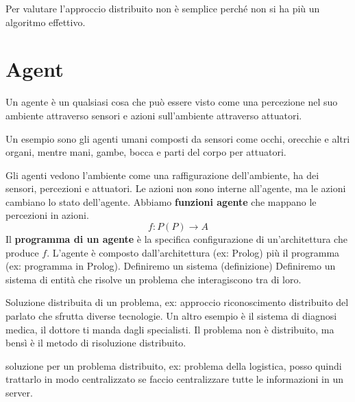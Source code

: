 Per valutare l'approccio distribuito non è semplice perché non si ha più un
algoritmo effettivo.

\section{Agent}
\begin{definizione}
    Un agente è un qualsiasi cosa che può essere visto come una percezione nel
    suo ambiente attraverso sensori e azioni sull'ambiente attraverso attuatori.
\end{definizione}

\begin{esempio}
    Un esempio sono gli agenti umani composti da sensori come occhi, orecchie e altri
    organi, mentre mani, gambe, bocca e parti del corpo per attuatori.
\end{esempio}

Gli agenti vedono l'ambiente come una raffigurazione dell'ambiente, ha dei sensori,
percezioni e attuatori. Le azioni non sono interne all'agente, ma le azioni cambiano
lo stato dell'agente. Abbiamo \textbf{funzioni agente} che mappano le percezioni
in azioni.
$$f:P(P)\rightarrow A$$
Il \textbf{programma di un agente} è la specifica configurazione di un'architettura che
produce $f$.
L'agente è composto dall'architettura (ex: Prolog) più il programma (ex: programma in Prolog).
Definiremo un sistema (definizione)
Definiremo un sistema di entità che risolve un problema che interagiscono tra di loro.

Soluzione distribuita di un problema, ex: approccio riconoscimento distribuito
del parlato che sfrutta diverse tecnologie. Un altro esempio è il sistema di diagnosi
medica, il dottore ti manda dagli specialisti. Il problema non è distribuito,
ma bensì è il metodo di risoluzione distribuito.

soluzione per un problema distribuito, ex: problema della logistica, posso quindi
trattarlo in modo centralizzato se faccio centralizzare tutte le informazioni in
un server.